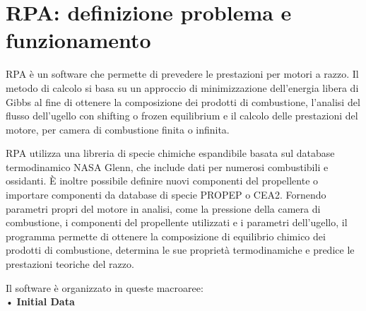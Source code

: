 \section{RPA: definizione problema e funzionamento}
\label{appendix:rpa}

RPA è un software che permette di prevedere le prestazioni per motori a razzo. Il metodo di calcolo si basa su un approccio di minimizzazione dell'energia libera di Gibbs al fine di ottenere la composizione dei prodotti di combustione, l'analisi del flusso dell'ugello con shifting o frozen equilibrium e il calcolo delle prestazioni del motore, per camera di combustione finita o infinita.

RPA utilizza una libreria di specie chimiche espandibile basata sul database termodinamico NASA Glenn, che include dati per numerosi combustibili e ossidanti. È inoltre possibile definire nuovi componenti del propellente o importare componenti da database di specie PROPEP o CEA2.
Fornendo parametri propri del motore in analisi, come la pressione della camera di combustione, i componenti del propellente utilizzati e i parametri dell'ugello, il programma permette di ottenere la composizione di equilibrio chimico dei prodotti di combustione, determina le sue proprietà termodinamiche e predice le prestazioni teoriche del razzo. 

Il software è organizzato in queste macroaree: 
\\
• \textbf{Initial Data}

